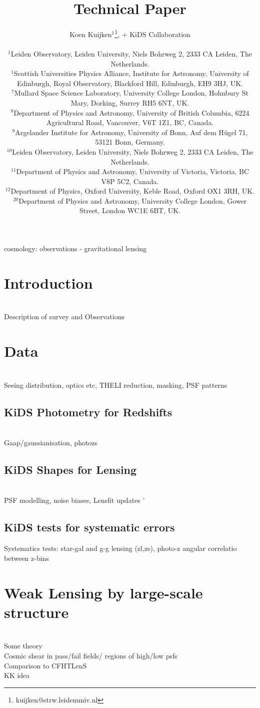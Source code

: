 \documentclass[useAMS,usenatbib,times,letter,amssymb]{mn2e}
\title[KiDS]{Technical Paper}
\author[K. Kuijken et al.]{Koen Kuijken$^{1}$\thanks{kuijken@strw.leidenuniv.nl}, + KiDS Collaboration\\
\\
$^{1}$Leiden Observatory, Leiden University, Niels Bohrweg 2, 2333 CA Leiden, The Netherlands.\\
$^1$Scottish Universities Physics Alliance, Institute for Astronomy, University of Edinburgh, Royal Observatory, Blackford Hill, Edinburgh, EH9 3HJ, UK.\\ 
$^7$Mullard Space Science Laboratory, University College London, Holmbury St Mary, Dorking, Surrey RH5 6NT, UK.\\
$^8$Department of Physics and Astronomy, University of British Columbia, 6224 Agricultural Road, Vancouver, V6T 1Z1, BC, Canada.\\  
$^9$Argelander Institute for Astronomy, University of Bonn, Auf dem H{\"u}gel 71, 53121 Bonn, Germany.\\
$^{10}$Leiden Observatory, Leiden University, Niels Bohrweg 2, 2333 CA Leiden, The Netherlands.\\
$^{11}$Department of Physics and Astronomy, University of Victoria, Victoria, BC V8P 5C2, Canada.\\
$^{12}$Department of Physics, Oxford University, Keble Road, Oxford OX1 3RH, UK.\\ 
$^{20}$Department of Physics and Astronomy, University College London, Gower Street, London WC1E 6BT, UK.\\
}
\newcommand{\red}[1]{{\color{red}{#1}}}
\begin{document}
\maketitle

\begin{abstract}

\end{abstract}


\begin{keywords}
cosmology: observations - gravitational lensing 
\end{keywords}

\section{Introduction}
\label{sec:intro}
\red{KK/JdJ} \\

Description of survey and Observations

\section{Data}
\red{KK/JdJ/TE} \\

Seeing distribution, optics etc, THELI reduction, masking, PSF patterns

\subsection{KiDS Photometry for Redshifts}
\red{KK,HH/AC}\\

Gaap/gaussianisation, photozs

\subsection{KiDS Shapes for Lensing}
\red{CH/LM/RN}\\

PSF modelling, noise biases, Lensfit updates '\\


\subsection{KiDS tests for systematic errors}
\red{CH/CB/KK/AC}

Systematics tests: star-gal and g-g lensing (zl,zs), photo-z angular correlatio between z-bins

\section{Weak Lensing by large-scale structure}
\red{KK/CH} \\
Some theory\\
Cosmic shear in pass/fail fields/ regions of high/low psfs\\
Comparison to CFHTLenS\\
KK idea
\end{document}
